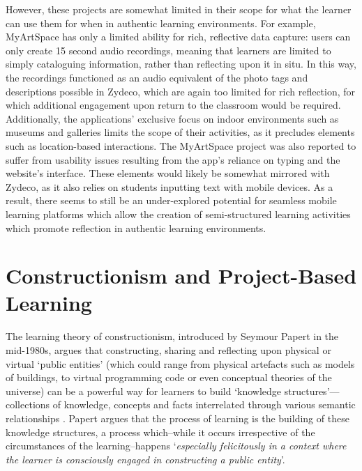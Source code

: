 However, these projects are somewhat limited in their scope for what the learner can use them for when in authentic learning environments. For example, MyArtSpace has only a limited ability for rich, reflective data capture: users can only create 15 second audio recordings, meaning that learners are limited to simply cataloguing information, rather than reflecting upon it in situ. In this way, the recordings functioned as an audio equivalent of the photo tags and descriptions possible in Zydeco, which are again too limited for rich reflection, for which additional engagement upon return to the classroom would be required. Additionally, the applications' exclusive focus on indoor environments such as museums and galleries limits the scope of their activities, as it precludes elements such as location-based interactions. The MyArtSpace project was also reported to suffer from usability issues resulting from the app’s reliance on typing and the website’s interface. These elements would likely be somewhat mirrored with Zydeco, as it also relies on students inputting text with mobile devices. As a result, there seems to still be an under-explored potential for seamless mobile learning platforms which allow the creation of semi-structured learning activities which promote reflection in authentic learning environments.


\section{Constructionism and Project-Based Learning}
\label{sec:ConstructionismPBL}

The learning theory of constructionism, introduced by Seymour Papert in the mid-1980s, argues that constructing, sharing and reflecting upon physical or virtual `public entities' (which could range from physical artefacts such as models of buildings, to virtual programming code or even conceptual theories of the universe) can be a powerful way for learners to build `knowledge structures'---collections of knowledge, concepts and facts interrelated through various semantic relationships \citep{PapertSeymourandHarel1991a}. Papert argues that the process of learning is the building of these knowledge structures, a process which--while it occurs irrespective of the circumstances of the learning--happens `\textit{especially felicitously in a context where the learner is consciously engaged in constructing a public entity}'. 

